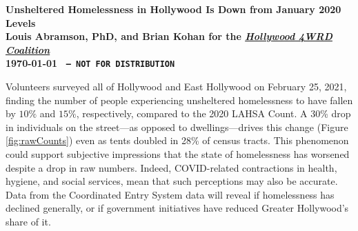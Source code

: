 \documentclass[11pt]{article}
\def\bfr{\bf\color{red}}
\def\resp{respectively}
\begin{document}

\begin{center}
	\Large\bf Unsheltered Homelessness in Hollywood Is Down from January 2020 Levels\\
	\vspace{1ex}
	{\normalsize\rm Louis Abramson, PhD, and Brian Kohan 
	for the \href{http://www.hollywood4wrd.live}{\it Hollywood 4WRD Coalition} \\ \today 
	{\bfr \texttt{ -- NOT FOR DISTRIBUTION}}}
\end{center}

 Volunteers surveyed all of Hollywood and East Hollywood on February 25, 
2021, finding the number of people experiencing unsheltered homelessness to have fallen 
by $10\%$ and $15\%$, \resp, compared to the 2020 LAHSA Count. A 30\% drop in individuals on the 
street---as opposed to dwellings---drives this change (Figure \ref{fig:rawCounts}) even as tents doubled in 
28\% of census tracts. This phenomenon could support subjective impressions that the 
state of homelessness has worsened despite a drop in raw numbers. Indeed, COVID-related 
contractions in health, hygiene, and social services, mean that such perceptions may also be accurate. 
Data from the Coordinated Entry System data will reveal if homelessness has declined generally, 
or if government initiatives have reduced Greater Hollywood's share of it.
\end{document}
